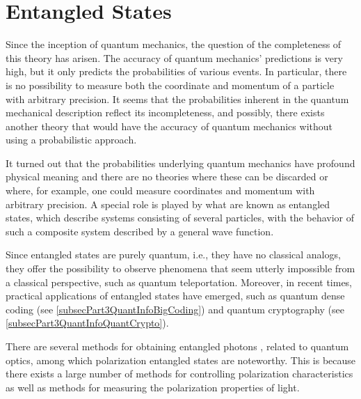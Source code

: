 \chapter{Entangled States}
\label{ch:entangl}

Since the inception of quantum mechanics, the question of the completeness of this theory has arisen. The accuracy of quantum mechanics' predictions is very high, but it only predicts the probabilities of various events. In particular, there is no possibility to measure both the coordinate and momentum of a particle with arbitrary precision. It seems that the probabilities inherent in the quantum mechanical description reflect its incompleteness, and possibly, there exists another theory that would have the accuracy of quantum mechanics without using a probabilistic approach.

It turned out that the probabilities underlying quantum mechanics have profound physical meaning and there are no theories where these can be discarded or where, for example, one could measure coordinates and momentum with arbitrary precision. A special role is played by what are known as entangled states, which describe systems consisting of several particles, with the behavior of such a composite system described by a general wave function.

Since entangled states are purely quantum, i.e., they have no classical analogs, they offer the possibility to observe phenomena that seem utterly impossible from a classical perspective, such as quantum teleportation. Moreover, in recent times, practical applications of entangled states have emerged, such as quantum dense coding (see \ref{subsecPart3QuantInfoBigCoding}) and quantum cryptography (see \ref{subsecPart3QuantInfoQuantCrypto}).

There are several methods for obtaining entangled photons \cite{bPhisQuantInfo}, related to quantum optics, among which polarization entangled states are noteworthy. This is because there exists a large number of methods for controlling polarization characteristics as well as methods for measuring the polarization properties of light.

%











